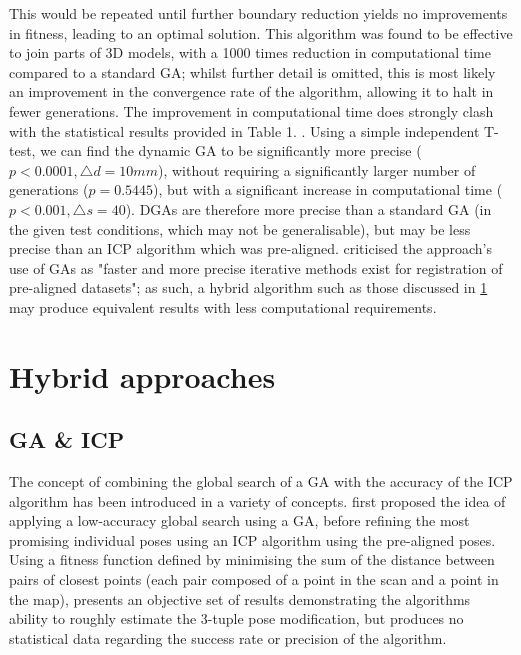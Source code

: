 \documentclass[authoryearcitations]{UoYCSproject}
\begin{document}
This would be repeated until further boundary reduction yields no improvements in fitness, leading to an optimal solution. This algorithm was found to be effective to join parts of 3D models, with a 1000 times reduction in computational time compared to a standard GA; whilst further detail is omitted, this is most likely an improvement in the convergence rate of the algorithm, allowing it to halt in fewer generations. The improvement in computational time does strongly clash with the statistical results provided in Table 1. \cite{Chow2004-xc}. Using a simple independent T-test, we can find the dynamic GA to be significantly more precise ($p<0.0001, \triangle d = 10mm$), without requiring a significantly larger number of generations ($p=0.5445$), but with a significant increase in computational time ($p<0.001, \triangle s = 40$). DGAs are therefore more precise than a standard GA (in the given test conditions, which may not be generalisable), but may be less precise than an ICP algorithm which was pre-aligned. \citet{Lomonosov2006-vq} criticised the approach's use of GAs as "faster and more precise iterative methods exist for registration of pre-aligned datasets"; as such, a hybrid algorithm such as those discussed in \ref{sec:hybrid_approaches} may produce equivalent results with less computational requirements.

\section{Hybrid approaches}
\label{sec:hybrid_approaches}
\subsection{GA \& ICP}
The concept of combining the global search of a GA with the accuracy of the ICP algorithm has been introduced in a variety of concepts. \citet{Brunnstrom1996-vo} first proposed the idea of applying a low-accuracy global search using a GA, before refining the most promising individual poses using an ICP algorithm using the pre-aligned poses. Using a fitness function defined by minimising the sum of the distance between pairs of closest points (each pair composed of a point in the scan and a point in the map), \citeauthor{Brunnstrom1996-vo} presents an objective set of results demonstrating the algorithms ability to roughly estimate the 3-tuple pose modification, but produces no statistical data regarding the success rate or precision of the algorithm. 
\end{document}
